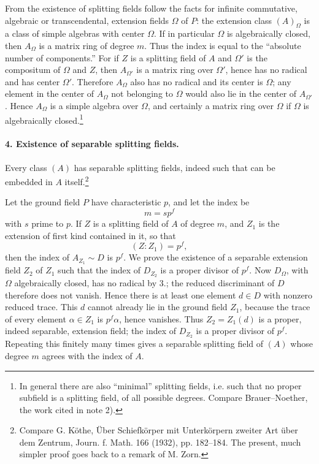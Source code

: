 \documentclass[11pt]{article}
\begin{document}
From the existence of splitting fields follow the facts for infinite commutative, algebraic or transcendental, extension fields \(\Omega\) of \(P\): the extension class \((A)_\Omega\) is a class of simple algebras with center \(\Omega\). If in particular \(\Omega\) is algebraically closed, then \(A_\Omega\) is a matrix ring of degree \(m\). Thus the index is equal to the “absolute number of components.” For if \(Z\) is a splitting field of \(A\) and \(\Omega'\) is the compositum of \(\Omega\) and \(Z\), then \(A_{\Omega'}\) is a matrix ring over \(\Omega'\), hence has no radical and has center \(\Omega'\). Therefore \(A_\Omega\) also has no radical and its center is \(\Omega\); any element in the center of \(A_\Omega\) not belonging to \(\Omega\) would also lie in the center of \(A_{\Omega'}\). Hence \(A_\Omega\) is a simple algebra over \(\Omega\), and certainly a matrix ring over \(\Omega\) if \(\Omega\) is algebraically closed.\footnote{In general there are also “minimal” splitting fields, i.e. such that no proper subfield is a splitting field, of all possible degrees. Compare Brauer--Noether, the work cited in note 2).}

\paragraph{4. Existence of separable splitting fields.}
Every class \((A)\) has separable splitting fields, indeed such that can be embedded in \(A\) itself.\footnote{Compare G. Köthe, Über Schiefkörper mit Unterkörpern zweiter Art über dem Zentrum, Journ. f. Math. 166 (1932), pp. 182--184. The present, much simpler proof goes back to a remark of M. Zorn.}

Let the ground field \(P\) have characteristic \(p\), and let the index be
\[
        m=s p^f
\]
with \(s\) prime to \(p\). If \(Z\) is a splitting field of \(A\) of degree \(m\), and \(Z_1\) is the extension of first kind contained in it, so that
\[
        (Z:Z_1)=p^f,
\]
then the index of \(A_{Z_1}\sim D\) is \(p^f\). We prove the existence of a separable extension field \(Z_2\) of \(Z_1\) such that the index of \(D_{Z_2}\) is a proper divisor of \(p^f\). Now \(D_\Omega\), with \(\Omega\) algebraically closed, has no radical by 3.; the reduced discriminant of \(D\) therefore does not vanish. Hence there is at least one element \(d\in D\) with nonzero reduced trace. This \(d\) cannot already lie in the ground field \(Z_1\), because the trace of every element \(\alpha\in Z_1\) is \(p^f\alpha\), hence vanishes. Thus \(Z_2=Z_1(d)\) is a proper, indeed separable, extension field; the index of \(D_{Z_2}\) is a proper divisor of \(p^f\). Repeating this finitely many times gives a separable splitting field of \((A)\) whose degree \(m\) agrees with the index of \(A\).
\end{document}

